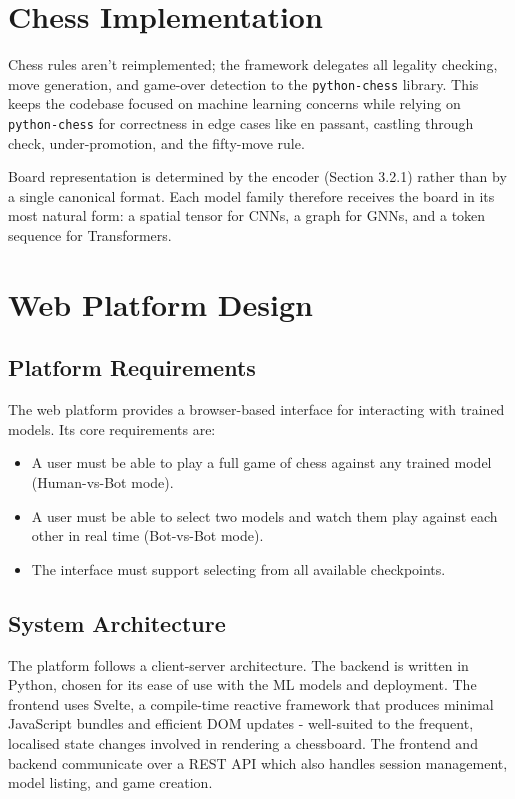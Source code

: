 
\section{Chess Implementation}

Chess rules aren't reimplemented; the framework delegates all legality checking, move generation, and game-over detection to the \texttt{python-chess} library. This keeps the codebase focused on machine learning concerns while relying on \texttt{python-chess} for correctness in edge cases like en passant, castling through check, under-promotion, and the fifty-move rule.

Board representation is determined by the encoder (Section 3.2.1) rather than by a single canonical format. Each model family therefore receives the board in its most natural form: a spatial tensor for CNNs, a graph for GNNs, and a token sequence for Transformers.

\section{Web Platform Design}

\subsection{Platform Requirements}
The web platform provides a browser-based interface for interacting with trained models. Its core requirements are:

\begin{itemize}
    \item A user must be able to play a full game of chess against any trained model (Human-vs-Bot mode).
    \item A user must be able to select two models and watch them play against each other in real time (Bot-vs-Bot mode).
    \item The interface must support selecting from all available checkpoints.
\end{itemize}

\subsection{System Architecture}
The platform follows a client-server architecture. The backend is written in Python, chosen for its ease of use with the ML models and deployment. The frontend uses Svelte, a compile-time reactive framework that produces minimal JavaScript bundles and efficient DOM updates - well-suited to the frequent, localised state changes involved in rendering a chessboard.
The frontend and backend communicate over a REST API which also handles session management, model listing, and game creation.

